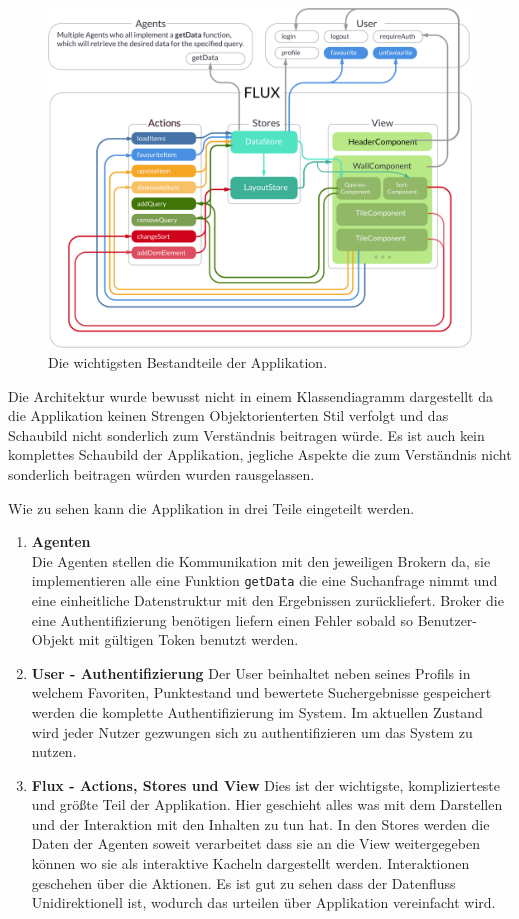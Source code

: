 \documentclass[12pt,twoside]{book}
\begin{document}
\begin{figure}[H]
    \centering
    \includegraphics[width=1.0\textwidth]{images/architecture.pdf}
    \caption{Die wichtigsten Bestandteile der Applikation.}
    \label{fig:awesome_image}
\end{figure}

Die Architektur wurde bewusst nicht in einem Klassendiagramm dargestellt da die Applikation keinen Strengen Objektorienterten Stil verfolgt und das Schaubild nicht sonderlich zum Verständnis beitragen würde. Es ist auch kein komplettes Schaubild der Applikation, jegliche Aspekte die zum Verständnis nicht sonderlich beitragen würden wurden rausgelassen.

Wie zu sehen kann die Applikation in drei Teile eingeteilt werden.

\begin{enumerate}
  \item \textbf{Agenten} \\
  Die Agenten stellen die Kommunikation mit den jeweiligen Brokern da, sie implementieren alle eine Funktion \texttt{getData} die eine Suchanfrage  nimmt und eine einheitliche Datenstruktur mit den Ergebnissen zurückliefert. Broker die eine Authentifizierung benötigen liefern einen Fehler sobald so Benutzer-Objekt mit gültigen Token benutzt werden.
  \item \textbf{User - Authentifizierung}
  Der User beinhaltet neben seines Profils in welchem Favoriten, Punktestand und bewertete Suchergebnisse gespeichert werden die komplette Authentifizierung im System. Im aktuellen Zustand wird jeder Nutzer gezwungen sich zu authentifizieren um das System zu nutzen.
  \item \textbf{Flux - Actions, Stores und View}
  Dies ist der wichtigste, komplizierteste und größte Teil der Applikation. Hier geschieht alles was mit dem Darstellen und der Interaktion mit den Inhalten zu tun hat. In den Stores werden die Daten der Agenten soweit verarbeitet dass sie an die View weitergegeben können wo sie als interaktive Kacheln dargestellt werden. Interaktionen geschehen über die Aktionen. Es ist gut zu sehen dass der Datenfluss Unidirektionell ist, wodurch das urteilen über Applikation vereinfacht wird.

\end{enumerate}
\end{document}
